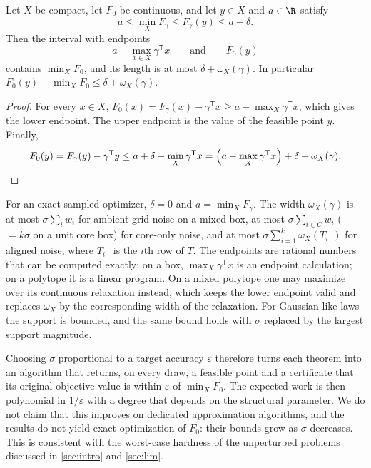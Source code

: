 \begin{proposition}\label{prop:model:regret}
Let $X$ be compact, let $F_0$ be continuous, and let $y\in X$ and $a\in\R$
satisfy
\[
 a\le\min_XF_\gamma\le F_\gamma(y)\le a+\delta.
\]
Then the interval with endpoints
\[
 a-\max_{x\in X}\gamma^{\mathsf T}x\qquad\text{and}\qquad F_0(y)
\]
contains $\min_XF_0$, and its length is at most $\delta+\omega_X(\gamma)$. In
particular $F_0(y)-\min_XF_0\le\delta+\omega_X(\gamma)$.
\end{proposition}

\begin{proof}
For every $x\in X$, $F_0(x)=F_\gamma(x)-\gamma^{\mathsf T}x\ge
a-\max_X\gamma^{\mathsf T}x$, which gives the lower endpoint. The upper
endpoint is the value of the feasible point $y$. Finally,
\[
 F_0(y)=F_\gamma(y)-\gamma^{\mathsf T}y\le a+\delta-\min_X\gamma^{\mathsf T}x
 =\Bigl(a-\max_X\gamma^{\mathsf T}x\Bigr)+\delta+\omega_X(\gamma).\qedhere
\]
\end{proof}

For an exact sampled optimizer, $\delta=0$ and $a=\min_XF_\gamma$. The width
$\omega_X(\gamma)$ is at most $\sigma\sum_iw_i$ for ambient grid noise on a
mixed box, at most $\sigma\sum_{i\in C}w_i$ ($=k\sigma$ on a unit core box)
for core-only noise, and at most $\sigma\sum_{i=1}^k\omega_X(T_{i\cdot})$ for
aligned noise, where $T_{i\cdot}$ is the $i$th row of $T$. The endpoints are
rational numbers that can be computed exactly: on a box,
$\max_X\gamma^{\mathsf T}x$ is an endpoint calculation; on a polytope it is a
linear program. On a mixed polytope one may maximize over its continuous
relaxation instead, which keeps the lower endpoint valid and replaces
$\omega_X$ by the corresponding width of the relaxation. For Gaussian-like
laws the support is bounded, and the same bound holds with $\sigma$ replaced
by the largest support magnitude.

Choosing $\sigma$ proportional to a target accuracy $\varepsilon$ therefore
turns each theorem into an algorithm that returns, on every draw, a feasible
point and a certificate that its original objective value is within
$\varepsilon$ of $\min_XF_0$. The expected work is then polynomial in
$1/\varepsilon$ with a degree that depends on the structural parameter. We
do not claim that this improves on dedicated approximation algorithms, and
the results do not yield exact optimization of $F_0$: their bounds grow as
$\sigma$ decreases. This is consistent with the worst-case hardness of the
unperturbed problems discussed in \cref{sec:intro} and \cref{sec:lim}.

